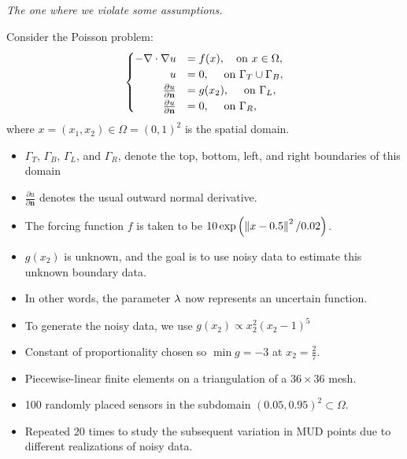 \begin{frame}[t]{\it The one where we violate some assumptions.}

Consider the Poisson problem:
\begin{equation}\label{eq:pde-equation}
\begin{cases}
\hfill -\nabla \cdot \nabla u &= f(x), \quad\text{on } x\in \Omega, \\
\hfill u &= 0, \quad\text{ on } \Gamma_T \cup \Gamma_B, \\
\hfill \frac{\partial u}{\partial \mathbf{n}} &= g(x_2), \quad\text{ on } \Gamma_L, \\
\hfill \frac{\partial u}{\partial \mathbf{n}} &= 0, \quad\text{ on } \Gamma_R,
\end{cases}
\end{equation}
where $x=(x_1, x_2) \in \Omega = (0,1)^2$ is the spatial domain.

\begin{itemize}
\item $\Gamma_T$, $\Gamma_B$, $\Gamma_L$, and $\Gamma_R$, denote the top, bottom, left, and right boundaries of this domain
\item $\frac{\partial u}{\partial \mathbf{n}}$ denotes the usual outward normal derivative.
\item The forcing function $f$ is taken to be $10\exp\left ( \left\Vert x - 0.5\right\Vert^2 / 0.02 \right )$.
\end{itemize}

\end{frame}


\begin{frame}[t]

\begin{itemize}
\item $g(x_2)$ is unknown, and the goal is to use noisy data to estimate this unknown boundary data.
\item In other words, the parameter $\lambda$ now represents an uncertain function.
\item To generate the noisy data, we use $g(x_2)\propto x_2^2(x_2-1)^5$
\item Constant of proportionality chosen so $\min{g}=-3$ at $x_2=\frac{2}{7}$.
\item Piecewise-linear finite elements on a triangulation of a $36\times36$ mesh.
\item 100 randomly placed sensors in the subdomain $(0.05, 0.95)^2 \subset \Omega$.
\item Repeated $20$ times to study the subsequent variation in MUD points due to different realizations of noisy data.
\end{itemize}

\end{frame}


